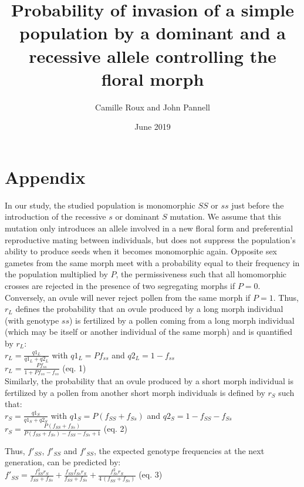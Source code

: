 \documentclass{article}
\title{Probability of invasion of a simple population by a dominant and a recessive allele controlling the floral morph}
\author{Camille Roux and John Pannell }
\date{June 2019}
\begin{document}
\maketitle


\section{Appendix}
In our study, the studied population is monomorphic $SS$ or $ss$ just before the introduction of the recessive $s$ or dominant $S$ mutation. We assume that this mutation only introduces an allele involved in a new floral form and preferential reproductive mating between individuals, but does not suppress the population's ability to produce seeds when it becomes monomorphic again. Opposite sex gametes from the same morph meet with a probability equal to their frequency in the population multiplied by $P$, the permissiveness such that all homomorphic crosses are rejected in the presence of two segregating morphs if $P=0$. Conversely, an ovule will never reject pollen from the same morph if $P=1$. Thus, $r_{\mathit{L}}$ defines the probability that an ovule produced by a long morph individual (with genotype $ss$) is fertilized by a pollen coming from a long morph individual (which may be itself or another individual of the same morph) and is quantified by $r_{\mathit{L}}$:\\
$r_{\mathit{L}} = \frac{q1_{\mathit{L}}}{q1_{\mathit{L}} + q2_{\mathit{L}}}$ with $q1_{\mathit{L}} = P f_{\mathit{ss}}$ and $q2_{\mathit{L}} = 1-f_{\mathit{ss}}$\\
$r_{\mathit{L}} = \frac{P f_{\mathit{ss}}}{1 + P f_{\mathit{ss}} - f_{\mathit{ss}}}$ (eq. 1)\\
\newline
Similarly, the probability that an ovule produced by a short morph individual is fertilized by a pollen from another short morph individuals is defined by $r_{\mathit{S}}$ such that:\\
$r_{\mathit{S}} = \frac{q1_{\mathit{S}}}{q1_{\mathit{S}} + q2_{\mathit{S}}}$ with $q1_{\mathit{S}} = P {\left(f_{\mathit{SS}} + f_{\mathit{Ss}}\right)}$ and $q2_{\mathit{S}} = 1 - f_{\mathit{SS}} - f_{\mathit{Ss}}$\\
$r_{\mathit{S}} = \frac{P {\left(f_{\mathit{SS}} + f_{\mathit{Ss}}\right)}}{P {\left(f_{\mathit{SS}} + f_{\mathit{Ss}}\right)} - f_{\mathit{SS}} - f_{\mathit{Ss}} + 1}$ (eq. 2)\\
\newline

Thus, $f'_{\mathit{SS}}$, $f'_{\mathit{SS}}$ and $f'_{\mathit{SS}}$, the expected genotype frequencies at the next generation, can be predicted by:\\ 
$f'_{\mathit{SS}} = \frac{f_{\mathit{SS}}^{2} r_{S}}{f_{\mathit{SS}} + f_{\mathit{Ss}}} + \frac{f_{\mathit{SS}} f_{\mathit{Ss}} r_{S}}{f_{\mathit{SS}} + f_{\mathit{Ss}}} + \frac{f_{\mathit{Ss}}^{2} r_{S}}{4 \, {\left(f_{\mathit{SS}} + f_{\mathit{Ss}}\right)}}$ (eq. 3)\\
\end{document}
